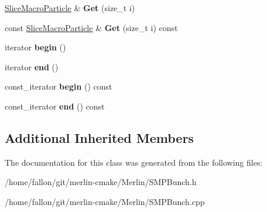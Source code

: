 \begin{DoxyCompactItemize}
\mbox{\label{classSMPTracking_1_1SMPBunch_aa82f6a7b11b8d3584e8db46f474a5f28}} 
\hyperlink{classSMPTracking_1_1SliceMacroParticle}{Slice\+Macro\+Particle} \& {\bfseries Get} (size\+\_\+t i)
\item 
\mbox{\label{classSMPTracking_1_1SMPBunch_a1de284864c1648809b1a45848b9e8d74}} 
const \hyperlink{classSMPTracking_1_1SliceMacroParticle}{Slice\+Macro\+Particle} \& {\bfseries Get} (size\+\_\+t i) const
\item 
\mbox{\label{classSMPTracking_1_1SMPBunch_a9c04dd6d79a6fbedeaa60e6ce1cd9f9c}} 
iterator {\bfseries begin} ()
\item 
\mbox{\label{classSMPTracking_1_1SMPBunch_a162a15d2e8d181ccd3d84846da756ae6}} 
iterator {\bfseries end} ()
\item 
\mbox{\label{classSMPTracking_1_1SMPBunch_aac93bcef780e7cfb7e8aff8ac34ec19f}} 
const\+\_\+iterator {\bfseries begin} () const
\item 
\mbox{\label{classSMPTracking_1_1SMPBunch_a884191c44c3e9992c9ed9bf87e5e4659}} 
const\+\_\+iterator {\bfseries end} () const
\end{DoxyCompactItemize}
\subsection*{Additional Inherited Members}


The documentation for this class was generated from the following files\+:\begin{DoxyCompactItemize}
\item 
/home/fallon/git/merlin-\/cmake/\+Merlin/S\+M\+P\+Bunch.\+h\item 
/home/fallon/git/merlin-\/cmake/\+Merlin/S\+M\+P\+Bunch.\+cpp\end{DoxyCompactItemize}
